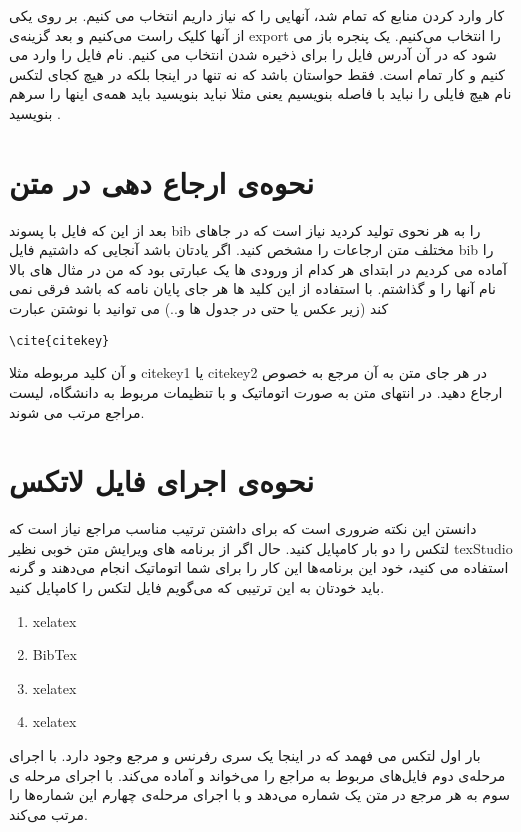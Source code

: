 کار وارد کردن منابع که تمام شد، آنهایی را که نیاز داریم انتخاب می کنیم. بر روی یکی از آنها کلیک راست می‌کنیم و بعد گزینه‌ی export‌ را انتخاب می‌کنیم. یک پنجره باز می شود که در آن آدرس فایل را برای ذخیره شدن انتخاب می کنیم. نام فایل را وارد می کنیم و کار تمام است. فقط حواستان باشد که نه تنها در اینجا بلکه در هیچ کجای لتکس نام هیچ فایلی را نباید با فاصله بنویسیم یعنی مثلا نباید بنویسید  باید همه‌ی اینها را سر‌هم بنویسید .

\section{نحوه‌ی ارجاع دهی در متن }
بعد از این که فایل با پسوند bib  را به هر نحوی تولید کردید نیاز است که در جاهای مختلف متن ارجاعات را مشخص کنید. اگر یادتان باشد آنجایی که داشتیم فایل bib را آماده می کردیم در ابتدای هر کدام از  ورودی ها یک عبارتی بود که من در مثال های بالا نام آنها را  و  گذاشتم. با استفاده از این کلید ها هر جای پایان نامه که باشد فرقی نمی کند (زیر عکس یا حتی در جدول ها و..) می توانید با نوشتن عبارت 
\begin{latin}
	\begin{lstlisting}[style=Tex]
\cite{citekey}
	\end{lstlisting}
\end{latin}
و آن کلید مربوطه مثلا citekey1 یا citekey2 در هر جای متن به آن مرجع به خصوص ارجاع دهید. 
در انتهای متن به صورت اتوماتیک و با تنظیمات مربوط به دانشگاه، لیست مراجع مرتب می شوند. 

\section{نحوه‌ی اجرای فایل لاتکس}
دانستن این نکته ضروری است که برای داشتن ترتیب مناسب مراجع نیاز است که لتکس را دو بار کامپایل کنید. حال اگر از برنامه های ویرایش متن خوبی نظیر texStudio استفاده می کنید، خود این برنامه‌ها این کار را برای شما اتوماتیک انجام می‌دهند و گرنه باید خودتان به این ترتیبی که می‌گویم فایل لتکس را کامپایل کنید.
\begin{enumerate}
	\item xelatex
	\item BibTex
	\item xelatex
	\item xelatex
\end{enumerate}
بار اول لتکس می فهمد که در اینجا یک سری رفرنس و مرجع وجود دارد. با اجرای مرحله‌ی دوم فایل‌های مربوط به مراجع را می‌خواند و آماده می‌کند. با اجرای مرحله ی سوم به هر مرجع در متن یک شماره می‌دهد و با اجرای مرحله‌ی چهارم این شماره‌ها را مرتب می‌کند. 
